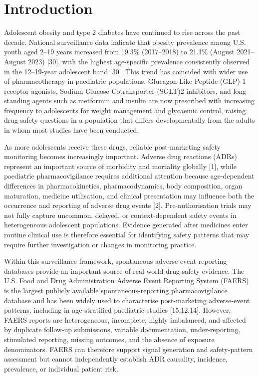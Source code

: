 \documentclass[10pt]{article}
\begin{document}
\section{Introduction}
Adolescent obesity and type 2 diabetes have continued to rise across the past decade. National surveillance data indicate that obesity prevalence among U.S. youth aged 2--19 years increased from 19.3\% (2017--2018) to 21.1\% (August 2021--August 2023) [30], with the highest age-specific prevalence consistently observed in the 12--19-year adolescent band [30]. This trend has coincided with wider use of pharmacotherapy in paediatric populations. Glucagon-Like Peptide (GLP)-1 receptor agonists, Sodium-Glucose Cotransporter (SGLT)2 inhibitors, and long-standing agents such as metformin and insulin are now prescribed with increasing frequency to adolescents for weight management and glycaemic control, raising drug-safety questions in a population that differs developmentally from the adults in whom most studies have been conducted.

As more adolescents receive these drugs, reliable post-marketing safety monitoring becomes increasingly important. Adverse drug reactions (ADRs) represent an important source of morbidity and mortality globally [1], while paediatric pharmacovigilance requires additional attention because age-dependent differences in pharmacokinetics, pharmacodynamics, body composition, organ maturation, medicine utilisation, and clinical presentation may influence both the occurrence and reporting of adverse drug events [2]. Pre-authorisation trials may not fully capture uncommon, delayed, or context-dependent safety events in heterogeneous adolescent populations. Evidence generated after medicines enter routine clinical use is therefore essential for identifying safety patterns that may require further investigation or changes in monitoring practice.

Within this surveillance framework, spontaneous adverse-event reporting databases provide an important source of real-world drug-safety evidence. The U.S. Food and Drug Administration Adverse Event Reporting System (FAERS) is the largest publicly available spontaneous-reporting pharmacovigilance database and has been widely used to characterise post-marketing adverse-event patterns, including in age-stratified paediatric studies [15,12,14]. However, FAERS reports are heterogeneous, incomplete, highly imbalanced, and affected by duplicate follow-up submissions, variable documentation, under-reporting, stimulated reporting, missing outcomes, and the absence of exposure denominators. FAERS can therefore support signal generation and safety-pattern assessment but cannot independently establish ADR causality, incidence, prevalence, or individual patient risk.
\end{document}
